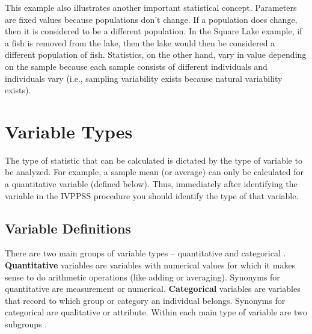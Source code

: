 \documentclass[10pt,openany]{book}\usepackage[]{graphicx}\usepackage[]{color}
\begin{document}

This example also illustrates another important statistical concept.  Parameters are fixed values because populations don't change.  If a population does change, then it is considered to be a different population.  In the Square Lake example, if a fish is removed from the lake, then the lake would then be considered a different population of fish.  Statistics, on the other hand, vary in value depending on the sample because each sample consists of different individuals and individuals vary (i.e., sampling variability exists because natural variability exists).



\section{Variable Types}\label{sect:VarTypes}
The type of statistic that can be calculated is dictated by the type of variable to be analyzed.  For example, a sample mean (or average) can only be calculated for a quantitative variable (defined below).  Thus, immediately after identifying the variable in the IVPPSS procedure you should identify the type of that variable.


\subsection{Variable Definitions}
There are two main groups of variable types -- quantitative and categorical .  \textbf{Quantitative} variables are variables with numerical values for which it makes sense to do arithmetic operations (like adding or averaging).  Synonyms for quantitative are measurement or numerical.  \textbf{Categorical} variables are variables that record to which group or category an individual belongs.  Synonyms for categorical are qualitative or attribute.  Within each main type of variable are two subgroups .
\end{document}
